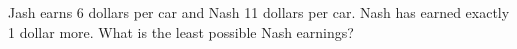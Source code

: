 Jash earns 6 dollars per car and Nash 11 dollars per car. Nash has earned exactly 1 dollar more. What is the least possible Nash earnings?
